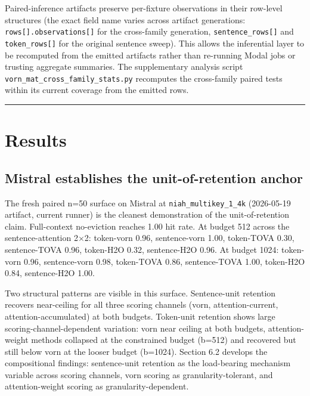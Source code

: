 \documentclass[10pt]{article}
\begin{document}
Paired-inference artifacts preserve per-fixture observations in their
row-level structures (the exact field name varies across artifact
generations: \texttt{rows{[}{]}.observations{[}{]}} for the cross-family
generation, \texttt{sentence\_rows{[}{]}} and \texttt{token\_rows{[}{]}}
for the original sentence sweep). This allows the inferential layer to
be recomputed from the emitted artifacts rather than re-running Modal
jobs or trusting aggregate summaries. The supplementary analysis script
\texttt{vorn\_mat\_cross\_family\_stats.\allowbreak{}py} recomputes the cross-family
paired tests within its current coverage from the emitted rows.

\begin{center}\rule{0.5\linewidth}{0.5pt}\end{center}

\section{Results}\label{5-results}

\subsection{Mistral establishes the unit-of-retention anchor}\label{51-mistral-establishes-the-unit-of-retention-anchor}

The fresh paired n=50 surface on Mistral at
\texttt{niah\_multikey\_1\_4k} (2026-05-19 artifact, current runner) is
the cleanest demonstration of the unit-of-retention claim. Full-context
no-eviction reaches 1.00 hit rate. At budget 512 across the
sentence-attention 2$\times$2: token-vorn 0.96, sentence-vorn 1.00,
token-TOVA 0.30, sentence-TOVA 0.96, token-H2O 0.32,
sentence-H2O 0.96. At budget 1024: token-vorn 0.96, sentence-vorn
0.98, token-TOVA 0.86, sentence-TOVA 1.00, token-H2O
0.84, sentence-H2O 1.00.

Two structural patterns are visible in this surface. Sentence-unit
retention recovers near-ceiling for all three scoring channels
(vorn, attention-current, attention-accumulated) at both
budgets. Token-unit retention shows large scoring-channel-dependent
variation: vorn near ceiling at both budgets, attention-weight methods
collapsed at the constrained budget (b=512) and recovered but still
below vorn at the looser budget (b=1024). Section 6.2 develops the
compositional findings: sentence-unit retention as the load-bearing
mechanism variable across scoring channels, vorn scoring
as granularity-tolerant, and attention-weight scoring as
granularity-dependent.
\end{document}
